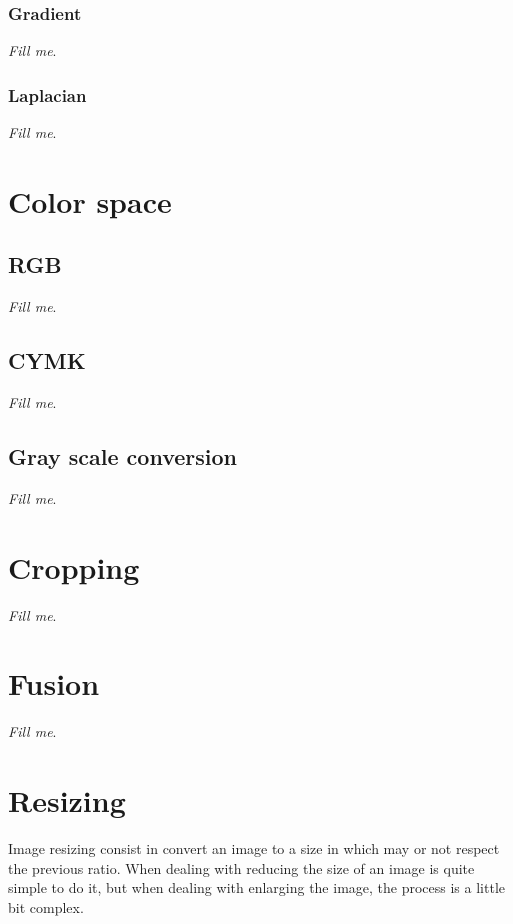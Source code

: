 \documentclass{report}
\begin{document}
		
		\subsubsection{Gradient}

			\textit{Fill me}.
		




		\subsubsection{Laplacian}

			\textit{Fill me}.

\section{Color space}          

	\subsection{RGB}
		
		\textit{Fill me}.

	\subsection{CYMK}

		\textit{Fill me}.

	\subsection{Gray scale conversion}

		\textit{Fill me}.

\section{Cropping}

	\textit{Fill me}.

\section{Fusion}

	\textit{Fill me}.

\section{Resizing}

	Image resizing consist in convert an image to a size in which may or not respect the previous ratio.
	When dealing with reducing the size of an image is quite simple to do it, but when dealing with enlarging 
	the image, the process is a little bit complex.
\end{document}
